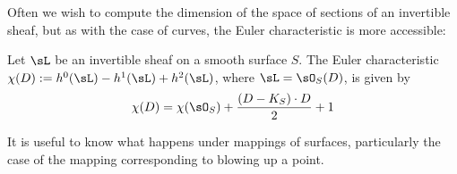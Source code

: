 %
%
%
%
Often we wish to compute the dimension of the space of sections of an invertible sheaf, but
as with the case of curves, the Euler characteristic is more accessible:

\begin{theorem} Let $\sL$ be an invertible sheaf on a smooth surface $S$.
The Euler characteristic $\chi(D) := h^0(\sL)-h^1(\sL)+h^2(\sL)$, where $\sL = \sO_S(D)$, is given by
$$
\chi(D) = \chi(\sO_S) + \frac{(D-K_S)\cdot D}{2}+1
$$
\end{theorem}

It is useful to know what happens under mappings of surfaces, particularly the case of the mapping
corresponding to blowing up a point.

